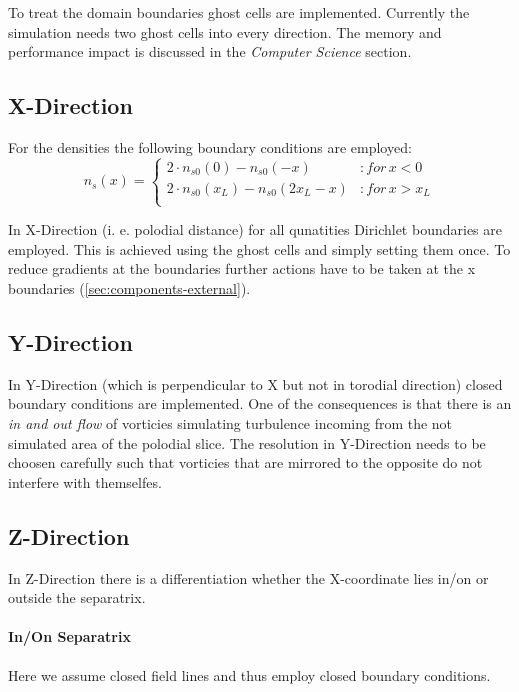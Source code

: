 \documentclass[master.tex]{subfiles}
\begin{document}
To treat the domain boundaries ghost cells are implemented. Currently the simulation needs two ghost cells into every direction. The memory and performance impact is discussed in the \textit{Computer Science} section.
\subsection{X-Direction}
For the densities the following boundary conditions are employed:
\begin{equation}
    n_s(x) = \begin{cases}
        2 \cdot n_{s0}(0) - n_{s0}(-x) &\colon for \, x < 0 \\
        2 \cdot n_{s0}(x_L) - n_{s0}(2x_L-x) &\colon for \, x > x_L \\
    \end{cases}
\end{equation}


In X-Direction (i. e. polodial distance) for all qunatities Dirichlet boundaries are employed. This is achieved using the ghost cells and simply setting them once. To reduce gradients at the boundaries further actions have to be taken at the x boundaries (\autoref{sec:components-external}). 
\subsection{Y-Direction}
In Y-Direction (which is perpendicular to X but not in torodial direction) closed boundary conditions are implemented. One of the consequences is that there is an \textit{in and out flow} of vorticies simulating turbulence incoming from the not simulated area of the polodial slice. The resolution in Y-Direction needs to be choosen carefully such that vorticies that are mirrored to the opposite do not interfere with themselfes. 
\subsection{Z-Direction}
In Z-Direction there is a differentiation whether the X-coordinate lies in/on or outside the separatrix.
\paragraph{In/On Separatrix}
Here we assume closed field lines and thus employ closed boundary conditions.
\end{document}
